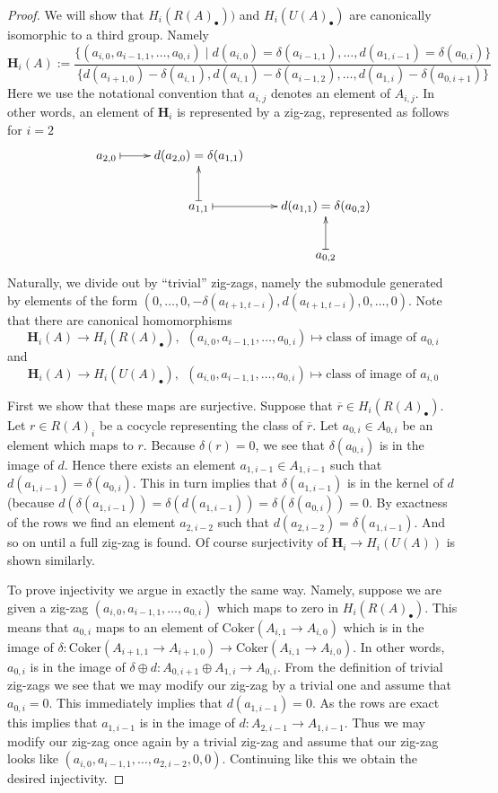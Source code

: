 \begin{proof}
We will show that $H_i(R(A)_\bullet))$
and $H_i(U(A)_\bullet)$ are canonically
isomorphic to a third group. Namely
$$
\mathbf{H}_i(A) :=
\frac{
\{
(a_{i,0}, a_{i-1,1}, \ldots, a_{0,i})
\mid
d(a_{i,0}) = \delta(a_{i-1,1}),\ldots,
d(a_{1, i-1}) = \delta(a_{0,i})
\}}
{
\{
d(a_{i+1,0}) - \delta(a_{i,1}),
d(a_{i,1}) - \delta(a_{i-1,2}),
\ldots,
d(a_{1,i}) - \delta(a_{0,i+1})
\}
}
$$
Here we use the notational convention that $a_{i,j}$ denotes
an element of $A_{i,j}$. In other words, an element of $\mathbf{H}_i$
is represented by a zig-zag, represented as follows for $i = 2$
$$
\xymatrix{
a_{2,0} \ar@{|->}[r] & d(a_{2,0}) = \delta(a_{1,1}) & \cr
& a_{1,1} \ar@{|->}[u] \ar@{|->}[r] & d(a_{1,1}) = \delta(a_{0,2}) \cr
& & a_{0,2} \ar@{|->}[u] \cr
}
$$
Naturally, we divide out by ``trivial'' zig-zags, namely the submodule
generated by elements of the form $(0,\ldots,0,-\delta(a_{t+1,t-i}),
d(a_{t+1,t-i}),0,\ldots,0)$. Note that there are canonical
homomorphisms
$$
\mathbf{H}_i(A) \to H_i(R(A)_\bullet),\ \ 
(a_{i,0}, a_{i-1,1}, \ldots, a_{0,i}) \mapsto 
\text{class of image of }a_{0,i}
$$
and
$$
\mathbf{H}_i(A) \to H_i(U(A)_\bullet),\ \ 
(a_{i,0}, a_{i-1,1}, \ldots, a_{0,i}) \mapsto 
\text{class of image of }a_{i,0}
$$

\medskip\noindent
First we show that these maps are surjective.
Suppose that $\overline{r} \in H_i(R(A)_\bullet)$.
Let $r \in R(A)_i$ be a cocycle representing the
class of $\overline{r}$.
Let $a_{0,i} \in A_{0,i}$ be an element which
maps to $r$. Because $\delta(r) = 0$,
we see that $\delta(a_{0,i})$ is in the
image of $d$. Hence there exists an element
$a_{1, i-1} \in A_{1,i-1}$ such that
$d(a_{1,i-1}) = \delta(a_{0,i})$. This in turn
implies that $\delta(a_{1,i-1})$ is in the kernel
of $d$ (because $d(\delta(a_{1,i-1})) = \delta(d(a_{1,i-1}))
= \delta(\delta(a_{0,i})) = 0$. By exactness of the
rows we find an element $a_{2, i-2}$ such that
$d(a_{2,i-2}) = \delta(a_{1,i-1})$. And so on
until a full zig-zag is found. Of course surjectivity
of $\mathbf{H}_i \to H_i(U(A))$ is shown similarly.

\medskip\noindent
To prove injectivity we argue in exactly the same way.
Namely, suppose we are given a zig-zag 
$(a_{i,0}, a_{i-1,1}, \ldots, a_{0,i})$
which maps to zero in $H_i(R(A)_\bullet)$.
This means that $a_{0, i}$ maps to an element
of $\text{Coker}(A_{i, 1} \to A_{i,0})$
which is in the image of
$\delta : \text{Coker}(A_{i+1, 1} \to A_{i+1,0}) \to
\text{Coker}(A_{i, 1} \to A_{i,0})$.
In other words, $a_{0,i}$ is in the image of
$\delta \oplus d : A_{0,i+1} \oplus A_{1, i} \to A_{0,i}$.
From the definition of trivial zig-zags we see that
we may modify our zig-zag by a trivial one and
assume that $a_{0,i} = 0$. This immediately
implies that $d(a_{1, i-1}) = 0$. As the rows
are exact this implies that $a_{1, i-1}$ is
in the image of $d : A_{2, i-1} \to A_{1, i-1}$.
Thus we may modify our zig-zag once again by a
trivial zig-zag and assume that our zig-zag looks
like $(a_{i,0}, a_{i-1,1}, \ldots, a_{2,i-2},0,0)$.
Continuing like this we obtain the desired injectivity.


\end{proof}
